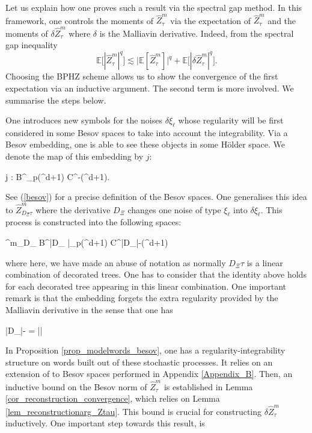 \documentclass[11pt]{preprint}
\def\eqref#1{(\ref{#1})}
\newcommand{\bfR}{\mathbf{R}}
\newcommand{\bbE}{\mathbb{E}}
\begin{document}
	Let us explain how one proves such a result via the spectral gap method. In this framework, one controls the moments of $ \widehat{Z}_{\tau}^{m} $ via the expectation of $ \widehat{Z}_{\tau}^{m}  $ and the moments of $ \delta \widehat{Z}_{\tau}^{m} $ where $\delta$ is the Malliavin derivative. Indeed, from the spectral gap inequality 
	$$
	\mathbb{E}\Big[|\widehat{Z}^m_\tau|^q\Big] \lesssim  \Big| \bbE[ \widehat{Z}^m_\tau]\Big|^q  + \mathbb{E}\Big[|\delta \widehat{Z}^m_\tau|^q\Big].
	$$
	 Choosing the BPHZ scheme  allows us to show the convergence of the first expectation via an inductive argument. The second term is more involved. We summarise the steps below.

	 One introduces new symbols for the noises $ \delta \xi_{\ell} $ whose regularity will be first considered in some Besov spaces to take into account the integrability.
		Via a Besov embedding, one is able to see these objects in some Hölder space. We denote the map of this embedding by $j$:
		\begin{equs} 
			j : B^{\alpha}_p(\bfR^{d+1}) \hookrightarrow C^{\alpha-}(\bfR^{d+1}).
		\end{equs} 
		 See \eqref{besov} for a precise definition of the Besov spaces. 
		One generalises this idea to $\widehat{Z}^m_{D_{\Xi} \tau}$ where the derivative $ D_{\Xi} $ changes one noise of type $ \xi_{\ell} $ into $ \delta \xi_{\ell} $. This process is constructed into the following spaces:
		\begin{equs}
			^m_{D_{\Xi} \tau}  \in B^{|D_{\Xi} \tau|}_{p}(\bfR^{d+1}) \hookrightarrow C^{|D_{\Xi}\tau|-}(\bfR^{d+1})
			\end{equs}
			where here, we have made an abuse of notation as normally $D_{\Xi} \tau$ is a linear combination of decorated trees. One has to consider that the identity above holds for each decorated tree appearing in this linear combination. One important remark is that the embedding forgets the extra regularity provided by the Malliavin derivative in the sense that one has
			\begin{equs}
				|D_{\Xi}\tau|-\frac{|\mathfrak{s}|}{p} = |\tau|
				\end{equs} 
		 In Proposition \ref{prop_modelwords_besov}, one has a regularity-integrability structure on words built out of these stochastic processes. It relies on an extension of \cite[Theorem 1]{LocalExpansionsParacSystems} to Besov spaces performed in Appendix \ref{Appendix_B}. Then, an inductive bound on the Besov norm of $ \widehat{Z}^m_{\tau}  $ is established in Lemma \ref{cor_reconstruction_convergence}, which relies on Lemma \ref{lem_reconstructionarg_Ztau}. This bound is crucial for constructing $ \delta \widehat{Z}^m_{\tau} $ inductively. One important step towards this result, is
\end{document}
